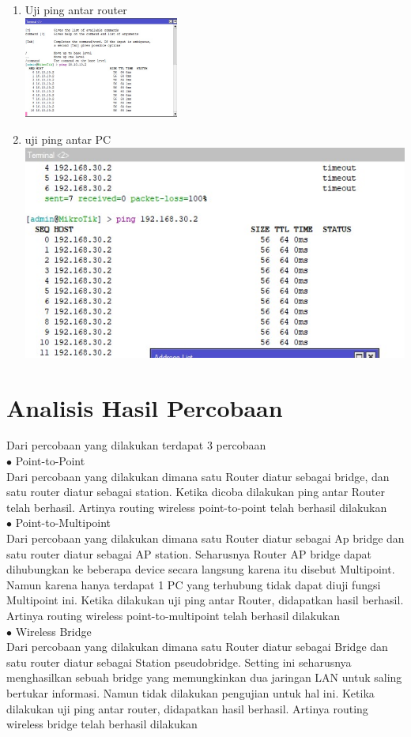 \begin{enumerate}
	\item Uji ping antar router\\
	\includegraphics[width=0.4\textwidth]{p4/img/pingrslt3.jpg}
	\item uji ping antar PC\\
	\includegraphics{p4/img/pingrslt2.jpg}
\end{enumerate}
\section{Analisis Hasil Percobaan}
Dari percobaan yang dilakukan terdapat 3 percobaan\\
$\bullet$ Point-to-Point\\
Dari percobaan yang dilakukan dimana satu Router diatur sebagai bridge, dan satu router diatur sebagai station. Ketika dicoba dilakukan ping antar Router telah berhasil. Artinya routing wireless point-to-point telah berhasil dilakukan\\
$\bullet$ Point-to-Multipoint\\
Dari percobaan yang dilakukan dimana satu Router diatur sebagai Ap bridge dan satu router diatur sebagai AP station. Seharusnya Router AP bridge dapat dihubungkan ke beberapa device secara langsung karena itu disebut Multipoint. Namun karena hanya terdapat 1 PC yang terhubung tidak dapat diuji fungsi Multipoint ini. Ketika dilakukan uji ping antar Router, didapatkan hasil berhasil. Artinya routing wireless point-to-multipoint telah berhasil dilakukan\\
$\bullet$ Wireless Bridge\\
Dari percobaan yang dilakukan dimana satu Router diatur sebagai Bridge dan satu router diatur sebagai Station pseudobridge. Setting ini seharusnya menghasilkan sebuah bridge yang memungkinkan dua jaringan LAN untuk saling bertukar informasi. Namun tidak dilakukan pengujian untuk hal ini. Ketika dilakukan uji ping antar router, didapatkan hasil berhasil. Artinya routing wireless bridge telah berhasil dilakukan

